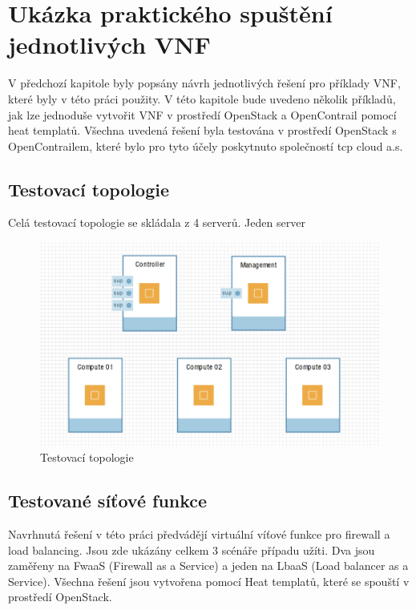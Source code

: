 \chapter{Ukázka praktického spuštění jednotlivých VNF}

V předchozí kapitole byly popsány návrh jednotlivých řešení pro příklady VNF, které byly v této práci použity. V této kapitole bude uvedeno několik příkladů, jak lze jednoduše vytvořit VNF v prostředí OpenStack a OpenContrail pomocí heat templatů. Všechna uvedená řešení byla testována v prostředí OpenStack s OpenContrailem, které bylo pro tyto účely poskytnuto společností tcp cloud a.s.

\section{Testovací topologie}\label{sub:interaction}

Celá testovací topologie se skládala z 4 serverů. Jeden server

\begin{figure}[h]
\begin{centering}
\includegraphics[scale=0.41]{images/ravello_topologie}
\par\end{centering}
\caption{Testovací topologie\label{fig:ravello_topologie}}
\end{figure}


\section{Testované síťové funkce}\label{sub:interaction}

Navrhnutá řešení v této práci předvádějí virtuální víťové funkce pro firewall a load balancing. Jsou zde ukázány celkem 3 scénáře případu užíti. Dva jsou zaměřeny na FwaaS (Firewall as a Service) a jeden na LbaaS (Load balancer as a Service). Všechna řešení jsou vytvořena pomocí Heat templatů, které se spouští v prostředí OpenStack.

